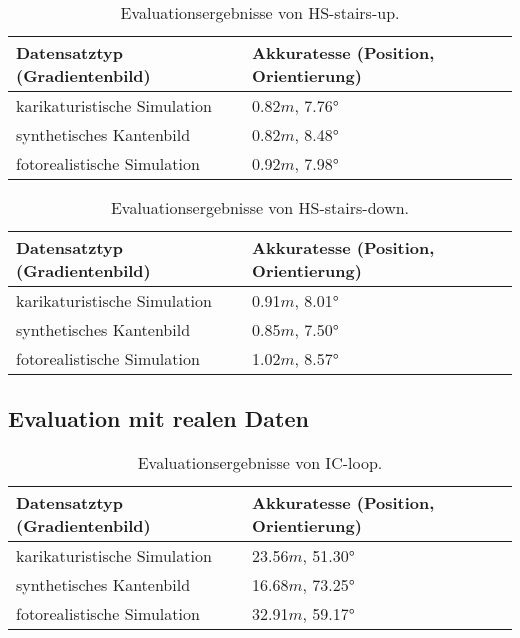 \begin{table}
	\centering
	\caption{Evaluationsergebnisse von HS-stairs-up.}
	\begin{tabularx}{0.75\textwidth}{X X}\textbf{Datensatztyp} \hspace{2cm} (Gradientenbild)& \textbf{Akkuratesse} \hspace{2cm} (Position, Orientierung)\\
		\hline
		karikaturistische Simulation & 0.82$m$, 7.76°\\
		\hline
		synthetisches Kantenbild & 0.82$m$, 8.48°\\
		\hline
		fotorealistische Simulation & 0.92$m$, 7.98°\\
	\end{tabularx}
	\label{tab:synth_hs_stairs_up}
\end{table}



\begin{table}
	\centering
	\caption{Evaluationsergebnisse von HS-stairs-down.}
	\begin{tabularx}{0.75\textwidth}{X X}\textbf{Datensatztyp} \hspace{2cm} (Gradientenbild)& \textbf{Akkuratesse} \hspace{2cm} (Position, Orientierung)\\
		\hline
		karikaturistische Simulation & 0.91$m$, 8.01°\\
		\hline
		synthetisches Kantenbild & 0.85$m$, 7.50°\\
		\hline
		fotorealistische Simulation & 1.02$m$, 8.57°\\
	\end{tabularx}
	\label{tab:synth_hs_stairs_down}
\end{table}

\cleardoublepage
\subsection{Evaluation mit realen Daten}


\begin{table}
	\centering
	\caption{Evaluationsergebnisse von IC-loop.}
	\begin{tabularx}{0.75\textwidth}{X X}\textbf{Datensatztyp} \hspace{2cm} (Gradientenbild)& \textbf{Akkuratesse} \hspace{2cm} (Position, Orientierung)\\
		\hline
		karikaturistische Simulation & 23.56$m$, 51.30°\\
		\hline
		synthetisches Kantenbild & 16.68$m$, 73.25°\\
		\hline
		fotorealistische Simulation & 32.91$m$, 59.17°\\
	\end{tabularx}
	\label{tab:synth_icloop}
\end{table}


